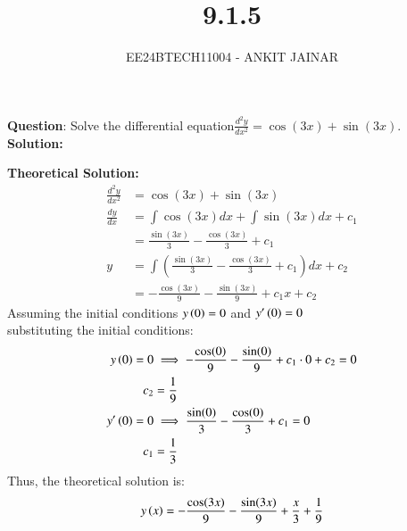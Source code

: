 \documentclass[journal]{IEEEtran}
\begin{document}

\vspace{3cm}

\title{9.1.5}
\author{EE24BTECH11004 - ANKIT JAINAR}
{\let\newpage\relax\maketitle}

\renewcommand{\thefigure}{\theenumi}
\renewcommand{\thetable}{\theenumi}
\setlength{\intextsep}{10pt} %

\renewcommand{\thetable}{\theenumi}

\textbf{Question}:
Solve the differential equation$\frac{d^2y}{dx^2} = \cos(3x) + \sin(3x)$.
\newline
\textbf{Solution: }
\begin{table}[h!]    
  \centering
  
  \label{tab1.1.2.2}
\end{table}
\newline
\textbf{Theoretical Solution:}
\begin{align}
    \frac{d^2y}{dx^2} &= \cos(3x) + \sin(3x) \\
    \frac{dy}{dx} &= \int \cos(3x)dx + \int \sin(3x)dx + c_1 \\
    &= \frac{\sin(3x)}{3} - \frac{\cos(3x)}{3} + c_1 \\
    y &= \int \left( \frac{\sin(3x)}{3} - \frac{\cos(3x)}{3} + c_1 \right) dx + c_2 \\
    &= -\frac{\cos(3x)}{9} - \frac{\sin(3x)}{9} + c_1x + c_2
\end{align}
\newline
Assuming the initial conditions $y\left(0\right) = 0$ and $y^{\prime}\left(0\right) = 0$\\
\newline
substituting the initial conditions:
\begin{align}
    y\left(0\right) = 0 &\implies -\frac{\cos(0)}{9} - \frac{\sin(0)}{9} + c_1 \cdot 0 + c_2 = 0 \\
    c_2 &= \frac{1}{9} \\
    y^{\prime}\left(0\right) = 0 &\implies \frac{\sin(0)}{3} - \frac{\cos(0)}{3} + c_1 = 0 \\
    c_1 &= \frac{1}{3}
\end{align}
Thus, the theoretical solution is:
\begin{align}
    y\left(x\right) = -\frac{\cos(3x)}{9} - \frac{\sin(3x)}{9} + \frac{x}{3} + \frac{1}{9}
\end{align}
\newline
\end{document}
